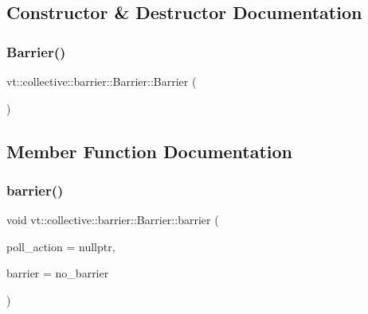 \subsection{Constructor \& Destructor Documentation}
\mbox{\label{structvt_1_1collective_1_1barrier_1_1_barrier_aa69e5135299fa366a2c59ac96a9f318d}} 
\subsubsection{\texorpdfstring{Barrier()}{Barrier()}}
{\footnotesize\ttfamily vt\+::collective\+::barrier\+::\+Barrier\+::\+Barrier (\begin{DoxyParamCaption}{ }\end{DoxyParamCaption})}



\subsection{Member Function Documentation}
\mbox{\label{structvt_1_1collective_1_1barrier_1_1_barrier_a05124050c7d353a4f3475ee1875dd46a}} 
\subsubsection{\texorpdfstring{barrier()}{barrier()}}
{\footnotesize\ttfamily void vt\+::collective\+::barrier\+::\+Barrier\+::barrier (\begin{DoxyParamCaption}\item[{\hyperlink{namespacevt_ae0a5a7b18cc99d7b732cb4d44f46b0f3}{Action\+Type}}]{poll\+\_\+action = {\ttfamily nullptr},  }\item[{\hyperlink{namespacevt_a25e481f0d6bbc7204db23d1c87a62e77}{Barrier\+Type} const \&}]{barrier = {\ttfamily no\+\_\+barrier} }\end{DoxyParamCaption})\hspace{0.3cm}{\ttfamily [inline]}}



